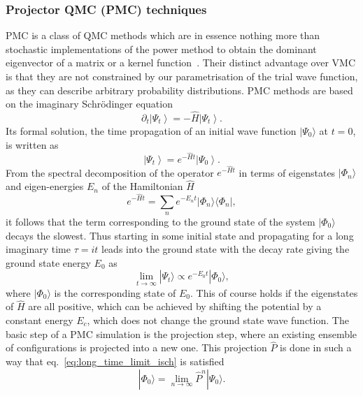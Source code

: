 \subsubsection{Projector QMC (PMC) techniques}
\label{subsubsec-PMC}
PMC is a class of QMC methods which are in essence nothing more than stochastic implementations of the power method to obtain the dominant eigenvector of a matrix or a kernel function~\cite{gubernatis_kawashima_werner_2016}. Their distinct advantage over VMC is that they are not constrained by our parametrisation of the trial wave function, as they can describe arbitrary probability distributions. PMC methods are based on the imaginary Schr\" odinger equation
\begin{equation}
	\label{eq:imgsch}
	\partial_{t}\left|\Psi_{t}\right\rangle=-\hat{H}\left|\Psi_{t}\right\rangle.
\end{equation}
Its formal solution, the time propagation of an initial wave function $|\Psi_0\rangle$ at $t=0$, is written as
\begin{equation}
\left| \Psi_{t} \right\rangle = e^{-\hat{H} t}\left|\Psi_{0}\right\rangle. 
\end{equation}
From the spectral decomposition of the operator $e^{-\hat{H} t}$ in terms of eigenstates $|\Phi_n\rangle$ and eigen-energies $E_n$ of the Hamiltonian $\hat{H}$
\begin{equation}
\label{eq:spectral_decompH}
e^{-\hat{H} t}=\sum_{n} e^{-E_{n} t}|\Phi_n\rangle\langle\Phi_n|, 
\end{equation}
it follows that the term corresponding to the ground state of the system $|\Phi_0\rangle$ decays the slowest. Thus starting in some initial state and propagating for a long imaginary time $\tau=it$ leads into the ground state with the decay rate giving the ground state energy $E_0$ as
\begin{equation}
\label{eq:long_time_limit_isch}
\lim_{t \rightarrow \infty} | \Psi_t \rangle \propto e^{-E_0 t} | \Phi_0 \rangle,
\end{equation} 
where $|\Phi_0\rangle$ is the corresponding state of $E_0$. This of course holds if the eigenstates of $\hat{H}$ are all positive, which can be achieved by shifting the potential by a constant energy $E_c$, which does not change the ground state wave function. The basic step of a PMC simulation is the projection step, where an existing ensemble of configurations is projected into a new one. This projection $\hat{P}$ is done in such a way that eq.~\eqref{eq:long_time_limit_isch} is satisfied
\begin{equation}
	| \Phi_{0}\rangle = \lim_{n\rightarrow \infty} \hat{P}^n |\Psi_{0}\rangle.
\end{equation}
